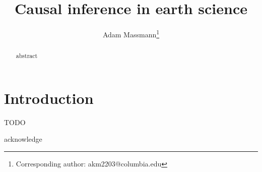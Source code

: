 \documentclass[12pt]{article}
\begin{document}
\title{Causal inference in earth science}

\author[1]{Adam Massmann\thanks{Corresponding author: akm2203@columbia.edu}}


\maketitle

\begin{abstract}
  abstract
\end{abstract}

\onehalfspacing

\section{Introduction}

TODO

\acknowledgments acknowledge
\end{document}
